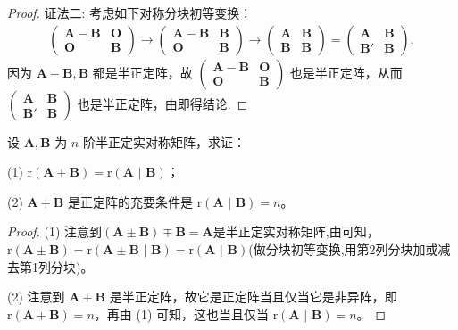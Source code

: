 \documentclass[../../main.tex]{subfiles}%
\begin{document}
\begin{proof}
{\color{blue}证法二:}
考虑如下对称分块初等变换：
\begin{align*}
\begin{pmatrix}
\boldsymbol{A}-\boldsymbol{B} & \boldsymbol{O} \\
\boldsymbol{O} & \boldsymbol{B}
\end{pmatrix}\to
\begin{pmatrix}
\boldsymbol{A}-\boldsymbol{B} & \boldsymbol{B} \\
\boldsymbol{O} & \boldsymbol{B}
\end{pmatrix}\to
\begin{pmatrix}
\boldsymbol{A} & \boldsymbol{B} \\
\boldsymbol{B} & \boldsymbol{B}
\end{pmatrix}=\begin{pmatrix}
\boldsymbol{A} & \boldsymbol{B} \\
\boldsymbol{B}' & \boldsymbol{B}
\end{pmatrix},
\end{align*}
因为 $\boldsymbol{A}-\boldsymbol{B},\boldsymbol{B}$ 都是半正定阵，故 $\begin{pmatrix}
\boldsymbol{A}-\boldsymbol{B} & \boldsymbol{O} \\
\boldsymbol{O} & \boldsymbol{B}
\end{pmatrix}$ 也是半正定阵，从而 $\begin{pmatrix}
\boldsymbol{A} & \boldsymbol{B} \\
\boldsymbol{B}' & \boldsymbol{B}
\end{pmatrix}$ 也是半正定阵，由即得结论.

\end{proof}

\begin{proposition}\label{proposition:例8.77}
设 $\boldsymbol{A},\boldsymbol{B}$ 为 $n$ 阶半正定实对称矩阵，求证：

(1) $\mathrm{r}(\boldsymbol{A}\pm \boldsymbol{B})=\mathrm{r}(\boldsymbol{A}\,\,|\,\,\boldsymbol{B})$；

(2) $\boldsymbol{A}+\boldsymbol{B}$ 是正定阵的充要条件是 $\mathrm{r}(\boldsymbol{A}\,\,|\,\,\boldsymbol{B})=n$。
\end{proposition}
\begin{proof}

(1) 注意到$(\boldsymbol{A}\pm \boldsymbol{B})\mp \boldsymbol{B}=\boldsymbol{A}$是半正定实对称矩阵,由可知，$\mathrm{r}(\boldsymbol{A}\pm \boldsymbol{B})=\mathrm{r}(\boldsymbol{A}\pm\boldsymbol{B}\,\,|\,\,\boldsymbol{B})=\mathrm{r}(\boldsymbol{A}\,\,|\,\,\boldsymbol{B})$(做分块初等变换,用第2列分块加或减去第1列分块)。

(2) 注意到 $\boldsymbol{A}+\boldsymbol{B}$ 是半正定阵，故它是正定阵当且仅当它是非异阵，即 $\mathrm{r}(\boldsymbol{A}+\boldsymbol{B})=n$，再由 (1) 可知，这也当且仅当 $\mathrm{r}(\boldsymbol{A}\,\,|\,\,\boldsymbol{B})=n$。

\end{proof}
\end{document}
